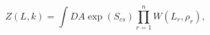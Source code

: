 \begin{equation}
Z(L,k)=\int DA\exp (S_{cs})\prod\limits_{r=1}^{n}W(L_{r},\rho _{r}),
\label{31}
\end{equation}

